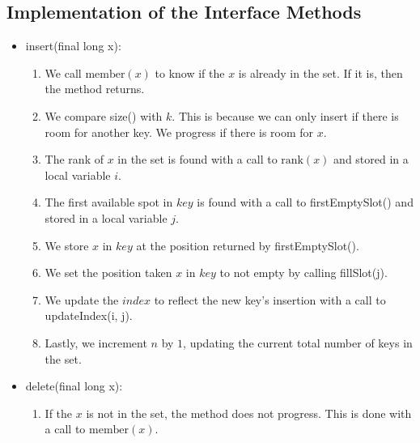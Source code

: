 \subsection{Implementation of the Interface Methods} \label{sec:binaryRankInterfaceImplementation}
\begin{itemize}
    \item \label{sec:binaryRankInsert}
    {\ttfamily insert(final long x)}:
    \begin{enumerate}
        \item
        We call $\text{member}(x)$ to know if the $x$ is already in the set. If it is, then the method returns.
        
        \item
        We compare {\ttfamily size()} with $k$. This is because we can only insert if there is room for another key. We progress if there is room for $x$.
        
        \item
        The rank of $x$ in the set is found with a call to  $\text{rank}(x)$ and stored in a local variable $i$.
        
        \item
        The first available spot in $key$ is found with a call to {\ttfamily firstEmptySlot()} and stored in a local variable $j$.
        
        \item
        We store $x$ in $key$ at the position returned by {\ttfamily firstEmptySlot()}.
        
        \item
        We set the position taken $x$ in $key$ to not empty by calling {\ttfamily fillSlot(j)}.
        
        \item
        We update the $index$ to reflect the new key's insertion with a call to {\ttfamily updateIndex(i, j)}.
        
        \item
        Lastly, we increment $n$ by $1$, updating the current total number of keys in the set.
    \end{enumerate}
    
    \item
    {\ttfamily delete(final long x)}:
    \begin{enumerate}
        \item
        If the $x$ is not in the set, the method does not progress. This is done with a call to $\text{member}(x)$.
        

\end{enumerate}
\end{itemize}
